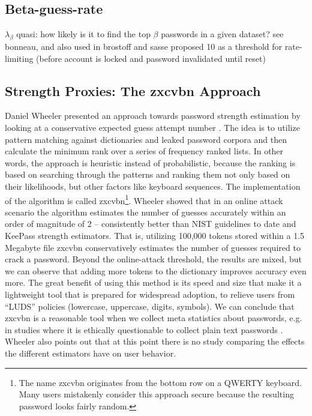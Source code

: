 	\subsection{Beta-guess-rate}
	$\lambda_{\beta}$
	quasi: how likely is it to find the top $\beta$ passwords in a given dataset?
	see bonneau, and also used in \cite{Yang2016MnemonicSentenceBased}
	brostoff and sasse  proposed 10 as a threshold for rate-limiting (before account is locked and password invalidated until reset) \cite{Brostoff2003TenStrikes}
	
	
	
	
	\subsection{Strength Proxies: The zxcvbn Approach}
Daniel Wheeler presented an approach towards password strength estimation by looking at a conservative expected guess attempt number \cite{Wheeler2016zxcvbn}. The idea is to utilize pattern matching against dictionaries and leaked password corpora and then calculate the minimum rank over a series of frequency ranked lists. In other words, the approach is heuristic instead of probabilistic, because the ranking is based on searching through the patterns and ranking them not only based on their likelihoods, but other factors like keyboard sequences. The implementation of the algorithm is called zxcvbn\footnote{The name zxcvbn originates from the bottom row on a QWERTY keyboard. Many users mistakenly consider this approach secure because the resulting password looks fairly random.}. Wheeler showed that in an online attack scenario \cite{Florencio2014AdministratorsGuide} the algorithm estimates the number of guesses accurately within an order of magnitude of 2 -- consistently better than NIST guidelines to date and KeePass strength estimators. That is, utilizing 100,000 tokens stored within a 1.5 Megabyte file zxcvbn conservatively estimates the number of guesses required to crack a password. Beyond the online-attack threshold, the results are mixed, but we can observe that adding more tokens to the dictionary improves accuracy even more. The great benefit of using this method is its speed and size that make it a lightweight tool that is prepared for widespread adoption, to relieve users from ``LUDS'' policies (lowercase, uppercase, digits, symbols). We can conclude that zxcvbn is a reasonable tool when we collect meta statistics about passwords, e.g. in studies where it is ethically questionable to collect plain text passwords \cite{Seitz2016SuggestionsDecoy}. Wheeler also points out that at this point there is no study comparing the effects the different estimators have on user behavior. 

